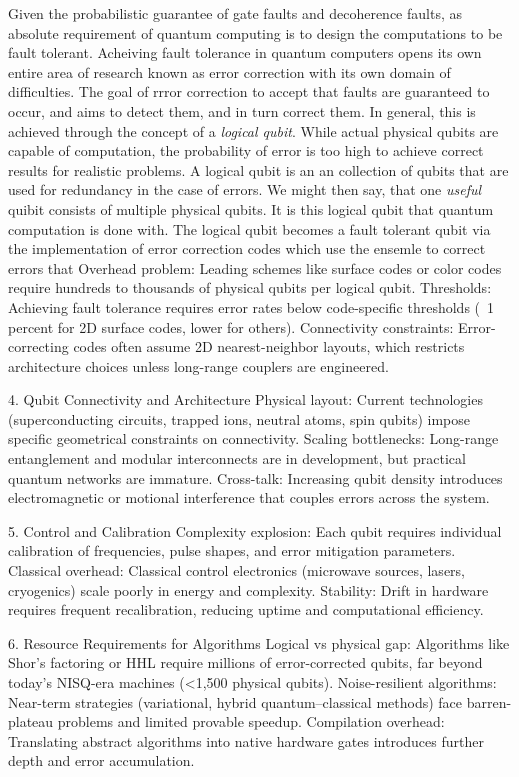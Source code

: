 \documentclass{elbioimp2}
\begin{document}
Given the probabilistic guarantee of gate faults and decoherence faults, as absolute requirement of quantum computing is to design the computations to be fault tolerant.
Acheiving fault tolerance in quantum computers opens its own entire area of research known as error correction with its own domain of difficulties. 
The goal of rrror correction  to accept that faults are guaranteed to occur, and aims to detect them, and in turn correct them.
In general, this is achieved through the concept of a \textit{logical qubit}. While actual physical qubits are capable of computation,
the probability of error is too high to achieve correct results for realistic problems. A logical qubit is an an {collection} of qubits that are used
for redundancy in the case of errors. We might then say, that one \textit{useful} quibit consists of multiple physical qubits. It is this logical qubit that quantum
computation is done with. The logical qubit becomes a fault tolerant qubit via the implementation of error correction codes which use the ensemle to correct errors that 
Overhead problem: Leading schemes like surface codes or color codes require hundreds to thousands of physical qubits per logical qubit.
Thresholds: Achieving fault tolerance requires error rates below code-specific thresholds (~1 percent for 2D surface codes, lower for others).
Connectivity constraints: Error-correcting codes often assume 2D nearest-neighbor layouts, which restricts architecture choices unless long-range couplers are engineered.

4. Qubit Connectivity and Architecture
Physical layout: Current technologies (superconducting circuits, trapped ions, neutral atoms, spin qubits) impose specific geometrical constraints on connectivity.
Scaling bottlenecks: Long-range entanglement and modular interconnects are in development, but practical quantum networks are immature.
Cross-talk: Increasing qubit density introduces electromagnetic or motional interference that couples errors across the system.

5. Control and Calibration
Complexity explosion: Each qubit requires individual calibration of frequencies, pulse shapes, and error mitigation parameters.
Classical overhead: Classical control electronics (microwave sources, lasers, cryogenics) scale poorly in energy and complexity.
Stability: Drift in hardware requires frequent recalibration, reducing uptime and computational efficiency.

6. Resource Requirements for Algorithms
Logical vs physical gap: Algorithms like Shor’s factoring or HHL require millions of error-corrected qubits, far beyond today’s NISQ-era machines (<1,500 physical qubits).
Noise-resilient algorithms: Near-term strategies (variational, hybrid quantum–classical methods) face barren-plateau problems and limited provable speedup.
Compilation overhead: Translating abstract algorithms into native hardware gates introduces further depth and error accumulation.
\end{document}
